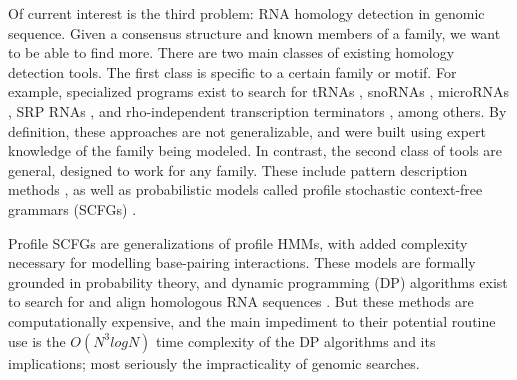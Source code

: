 \documentclass[11pt]{article}
\begin{document}

Of current interest is the third problem: RNA homology detection in
genomic sequence. Given a consensus structure and known members of a family,
we want to be able to find more. 
There are two main classes of existing homology detection tools. 
The first class is specific to a certain family or motif. For example,
specialized programs exist to search for tRNAs \cite{LoweEddy97}, snoRNAs
\cite{LoweEddy99}, microRNAs \cite{Lai03, Lim03}, SRP RNAs
\cite{Regalia02}, and rho-independent transcription terminators
\cite{Ermolaeva00}, among others. By definition, these approaches are not
generalizable, and were built using expert knowledge of the family
being modeled.  In contrast, the second class of tools are general,
designed to work for any family. These include pattern description
methods \cite{Macke01,  Gautheret01}, as well as probabilistic models
called profile stochastic context-free grammars (SCFGs) \cite{Eddy94,
 Sakakibara94c}. 

Profile SCFGs are generalizations of profile HMMs, with added
complexity necessary for modelling base-pairing interactions. These
models are formally grounded in probability theory, and dynamic
programming (DP) algorithms exist to search for and align
homologous RNA sequences \cite{Durbin98}. 
But these methods are computationally expensive, and the main
impediment to their potential routine use is the
 $O(N^3 log N)$ time complexity of the DP algorithms and its
implications; most seriously the impracticality of genomic searches.
\end{document}
